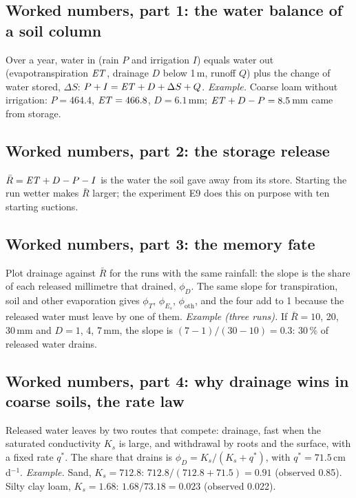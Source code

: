 \begin{pins}
\end{pins}


\subsection{Worked numbers, part 1: the water balance of a soil column}
Over a year, water in (rain $P$ and irrigation $I$) equals water out (evapotranspiration $\mathit{ET}$, drainage $D$ below 1\,m, runoff $Q$) plus the change of water stored, $\Delta S$: $P+I=\mathit{ET}+D+\Delta S+Q$.
\emph{Example.} Coarse loam without irrigation: $P=464.4$, $\mathit{ET}=466.8$, $D=6.1$\,mm; $\mathit{ET}+D-P=8.5$\,mm came from storage.


\subsection{Worked numbers, part 2: the storage release}
$\bar R=\mathit{ET}+D-P-I$ is the water the soil gave away from its store. Starting the run wetter makes $\bar R$ larger; the experiment E9 does this on purpose with ten starting suctions.


\subsection{Worked numbers, part 3: the memory fate}
Plot drainage against $\bar R$ for the runs with the same rainfall: the slope is the share of each released millimetre that drained, $\phi_D$. The same slope for transpiration, soil and other evaporation gives $\phi_T$, $\phi_{E_s}$, $\phi_{\mathrm{oth}}$, and the four add to 1 because the released water must leave by one of them.
\emph{Example (three runs).} If $\bar R=10$, 20, 30\,mm and $D=1$, 4, 7\,mm, the slope is $(7-1)/(30-10)=0.3$: 30\,\% of released water drains.


\subsection{Worked numbers, part 4: why drainage wins in coarse soils, the rate law}
Released water leaves by two routes that compete: drainage, fast when the saturated conductivity $K_s$ is large, and withdrawal by roots and the surface, with a fixed rate $q^\ast$. The share that drains is $\phi_D=K_s/(K_s+q^\ast)$, with $q^\ast=71.5$\,cm\,d$^{-1}$.
\emph{Example.} Sand, $K_s=712.8$: $712.8/(712.8+71.5)=0.91$ (observed 0.85). Silty clay loam, $K_s=1.68$: $1.68/73.18=0.023$ (observed 0.022).


